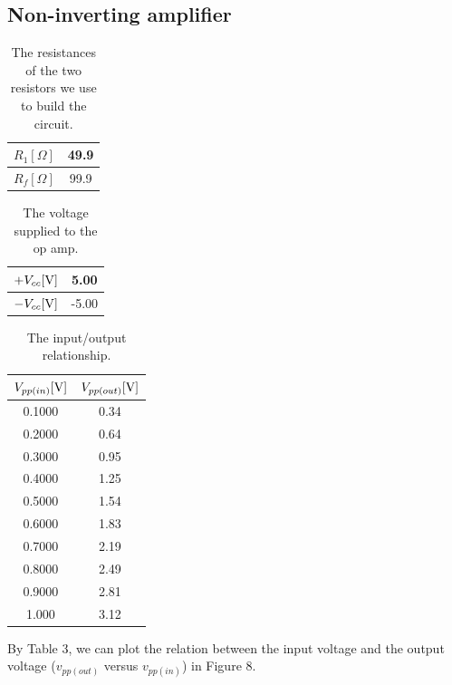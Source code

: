 \documentclass[a4paper]{report}
\begin{document}
	\subsection{Non-inverting amplifier}
	\begin{table}[H]
		\centering
		\begin{tabular}{|c|c|}
			\hline
			$R_1[\Omega]$&49.9\\
			\hline
			$R_f[\Omega]$&99.9\\
			\hline
		\end{tabular}
		\caption{The resistances of the two resistors we use to build the circuit.}
	\end{table}
	\begin{table}[H]
		\centering
		\begin{tabular}{|c|c|}
			\hline
			$+V_{cc}[\rm{V}]$&5.00\\
			\hline
			$-V_{cc}[\rm{V}]$&-5.00\\
			\hline
		\end{tabular}
		\caption{The voltage supplied to the op amp.}
	\end{table}
	\begin{table}[H]
		\centering
		\begin{tabular}{|c|c|}
			\hline
			$V_{pp(in)}[\rm{V}]$&$V_{pp(out)}[\rm{V}]$\\
			\hline
			0.1000&0.34\\
			\hline
			0.2000&0.64\\
			\hline
			0.3000&0.95\\
			\hline
			0.4000&1.25\\
			\hline
			0.5000&1.54\\
			\hline
			0.6000&1.83\\
			\hline
			0.7000&2.19\\
			\hline
			0.8000&2.49\\
			\hline
			0.9000&2.81\\
			\hline
			1.000&3.12\\
			\hline
		\end{tabular}
		\caption{The input/output relationship.}
	\end{table}
	By Table 3, we can plot the relation between the input voltage and the output voltage ($v_{pp(out)}$ versus $v_{pp(in)}$) in Figure 8.
\end{document}
